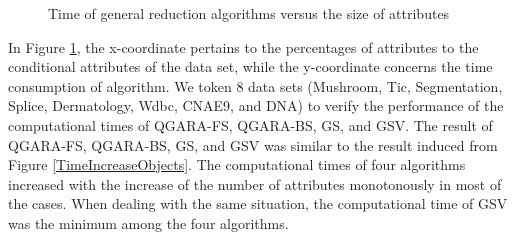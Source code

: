 \documentclass[review]{elsarticle}
\begin{document}
\begin{figure}[htbp]
{			}
			\caption{Time of general reduction algorithms versus the size of attributes} 
			\label{TimeIncreaseAttributes}
		\end{figure}
		\par In Figure \ref{TimeIncreaseAttributes}, the x-coordinate pertains to the percentages of attributes to the conditional attributes of the data set, while the y-coordinate concerns the time consumption of algorithm. We token 8 data sets (Mushroom, Tic, Segmentation, Splice, Dermatology, Wdbc, CNAE9, and DNA) to verify the performance of the computational times of QGARA-FS, QGARA-BS, GS, and GSV. The result of QGARA-FS, QGARA-BS, GS, and GSV was similar to the result induced from Figure \ref{TimeIncreaseObjects}. The computational times of four algorithms increased with the increase of the number of attributes monotonously in most of the cases. When dealing with the same situation, the computational time of GSV was the minimum among the four algorithms.
\end{document}
